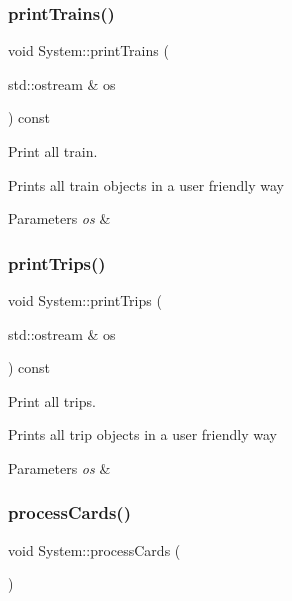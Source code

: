 \subsubsection{\texorpdfstring{print\+Trains()}{printTrains()}}
{\footnotesize\ttfamily void System\+::print\+Trains (\begin{DoxyParamCaption}\item[{std\+::ostream \&}]{os }\end{DoxyParamCaption}) const}



Print all train. 

Prints all train objects in a user friendly way


\begin{DoxyParams}{Parameters}
{\em os} & \\
\hline
\end{DoxyParams}
\mbox{\label{classSystem_abaa61b6377abcfc61da32092e5d734d9}} 
\subsubsection{\texorpdfstring{print\+Trips()}{printTrips()}}
{\footnotesize\ttfamily void System\+::print\+Trips (\begin{DoxyParamCaption}\item[{std\+::ostream \&}]{os }\end{DoxyParamCaption}) const}



Print all trips. 

Prints all trip objects in a user friendly way


\begin{DoxyParams}{Parameters}
{\em os} & \\
\hline
\end{DoxyParams}
\mbox{\label{classSystem_aebffe11376f68cb17175f30ea517c10b}} 
\subsubsection{\texorpdfstring{process\+Cards()}{processCards()}}
{\footnotesize\ttfamily void System\+::process\+Cards (\begin{DoxyParamCaption}{ }\end{DoxyParamCaption})}



